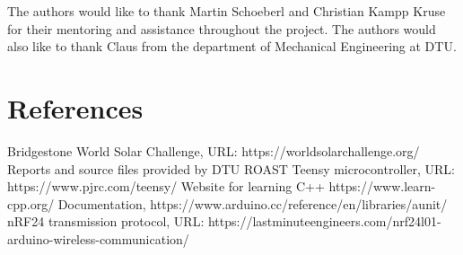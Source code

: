 \documentclass[conference]{IEEEtran}
\begin{document}
The authors would like to thank Martin Schoeberl and Christian Kampp Kruse for their mentoring and assistance throughout the project. The authors would also like to thank Claus from the department of Mechanical Engineering at DTU.




\section{References}
\begingroup
\renewcommand{\section}[2]{}%
\begin{thebibliography}{}
Bridgestone World Solar Challenge, 
URL: https://worldsolarchallenge.org/
Reports and source files provided by DTU ROAST
Teensy microcontroller,
URL: https://www.pjrc.com/teensy/
Website for learning C++
https://www.learn-cpp.org/
Documentation,
https://www.arduino.cc/reference/en/libraries/aunit/
nRF24 transmission protocol, URL: https://lastminuteengineers.com/nrf24l01-arduino-wireless-communication/
\end{thebibliography}
\endgroup
\end{document}
